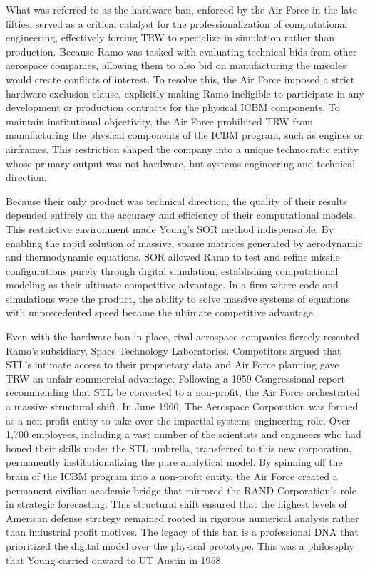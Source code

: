 What was referred to as the hardware ban, enforced by the Air Force in the late fifties, served as a critical catalyst for the professionalization of computational engineering, effectively forcing TRW to specialize in simulation rather than production. Because Ramo was tasked with evaluating technical bids from other aerospace companies, allowing them to also bid on manufacturing the missiles would create conflicts of interest. To resolve this, the Air Force imposed a strict hardware exclusion clause, explicitly making Ramo ineligible to participate in any development or production contracts for the physical ICBM components. To maintain institutional objectivity, the Air Force prohibited TRW from manufacturing the physical components of the ICBM program, such as engines or airframes. This restriction shaped the company into a unique technocratic entity whose primary output was not hardware, but systems engineering and technical direction. 

Because their only product was technical direction, the quality of their results depended entirely on the accuracy and efficiency of their computational models. This restrictive environment made Young's SOR method indispensable. By enabling the rapid solution of massive, sparse matrices generated by aerodynamic and thermodynamic equations, SOR allowed Ramo to test and refine missile configurations purely through digital simulation, establishing computational modeling as their ultimate competitive advantage. In a firm where code and simulations were the product, the ability to solve massive systems of equations with unprecedented speed became the ultimate competitive advantage. 

Even with the hardware ban in place, rival aerospace companies fiercely resented Ramo's subsidiary, Space Technology Laboratories. Competitors argued that STL's intimate access to their proprietary data and Air Force planning gave TRW an unfair commercial advantage. Following a 1959 Congressional report recommending that STL be converted to a non-profit, the Air Force orchestrated a massive structural shift. In June 1960, The Aerospace Corporation was formed as a non-profit entity to take over the impartial systems engineering role. Over 1,700 employees, including a vast number of the scientists and engineers who had honed their skills under the STL umbrella, transferred to this new corporation, permanently institutionalizing the pure analytical model. By spinning off the brain of the ICBM program into a non-profit entity, the Air Force created a permanent civilian-academic bridge that mirrored the RAND Corporation’s role in strategic forecasting. This structural shift ensured that the highest levels of American defense strategy remained rooted in rigorous numerical analysis rather than industrial profit motives. The legacy of this ban is a professional DNA that prioritized the digital model over the physical prototype. This was a philosophy that Young carried onward to UT Austin in 1958. 

